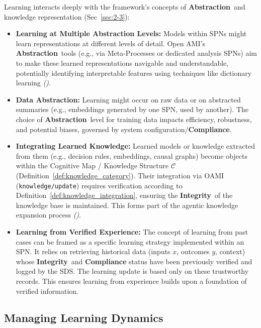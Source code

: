 \documentclass[12pt,a4paper]{report}
\renewcommand{\citep}[1]{\textit{\scriptsize{(\cite{#1})}}}
\newcommand{\Integrity}{\textbf{Integrity}}
\newcommand{\Abstraction}{\textbf{Abstraction}}
\begin{document}
	Learning interacts deeply with the framework's concepts of \Abstraction\ and knowledge representation (Sec~\ref{sec:2-3}):
	\begin{itemize}
		\item \textbf{Learning at Multiple Abstraction Levels:} Models within SPNs might learn representations at different levels of detail. Open AMI's \Abstraction\ tools (e.g., via Meta-Processes or dedicated analysis SPNs) aim to make these learned representations navigable and understandable, potentially identifying interpretable features using techniques like dictionary learning \citep{Anthropic_Decompose_2023}.
		\item \textbf{Data Abstraction:} Learning might occur on raw data or on abstracted summaries (e.g., embeddings generated by one SPN, used by another). The choice of \Abstraction\ level for training data impacts efficiency, robustness, and potential biases, governed by system configuration/\textbf{Compliance}.
		\item \textbf{Integrating Learned Knowledge:} Learned models or knowledge extracted from them (e.g., decision rules, embeddings, causal graphs) become objects within the Cognitive Map / Knowledge Structure $\mathcal{C}$ (Definition~\ref{def:knowledge_category}). Their integration via OAMI (\texttt{knowledge/update}) requires verification according to Definition~\ref{def:knowledge_integration}, ensuring the \Integrity\ of the knowledge base is maintained. This forms part of the agentic knowledge expansion process \citep{Buehler2025AgenticGraphRef}.
		\item \textbf{Learning from Verified Experience:} The concept of learning from past cases can be framed as a specific learning strategy implemented within an SPN. It relies on retrieving historical data (inputs $x$, outcomes $y$, context) whose \Integrity\ and \textbf{Compliance} status have been previously verified and logged by the SDS. The learning update is based only on these trustworthy records. This ensures learning from experience builds upon a foundation of verified information.
	\end{itemize}
	
	
	\subsection{Managing Learning Dynamics}
	\label{sec:2-5-3-new}
	
\end{document}

